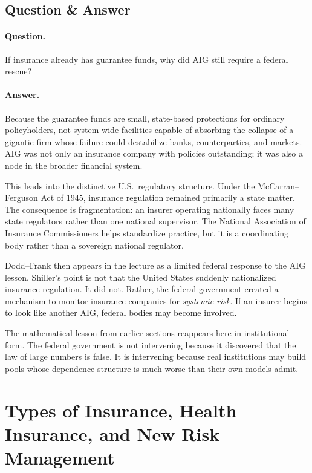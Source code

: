 \subsection{Question \& Answer}

\paragraph{Question.} If insurance already has guarantee funds, why did AIG still require a federal rescue?

\paragraph{Answer.} Because the guarantee funds are small, state-based protections for ordinary policyholders, not system-wide facilities capable of absorbing the collapse of a gigantic firm whose failure could destabilize banks, counterparties, and markets. AIG was not only an insurance company with policies outstanding; it was also a node in the broader financial system.

This leads into the distinctive U.S.\ regulatory structure. Under the McCarran--Ferguson Act of 1945, insurance regulation remained primarily a state matter. The consequence is fragmentation: an insurer operating nationally faces many state regulators rather than one national supervisor. The National Association of Insurance Commissioners helps standardize practice, but it is a coordinating body rather than a sovereign national regulator.

Dodd--Frank then appears in the lecture as a limited federal response to the AIG lesson. Shiller's point is not that the United States suddenly nationalized insurance regulation. It did not. Rather, the federal government created a mechanism to monitor insurance companies for \emph{systemic risk}. If an insurer begins to look like another AIG, federal bodies may become involved.

The mathematical lesson from earlier sections reappears here in institutional form. The federal government is not intervening because it discovered that the law of large numbers is false. It is intervening because real institutions may build pools whose dependence structure is much worse than their own models admit.

\section{Types of Insurance, Health Insurance, and New Risk Management}

